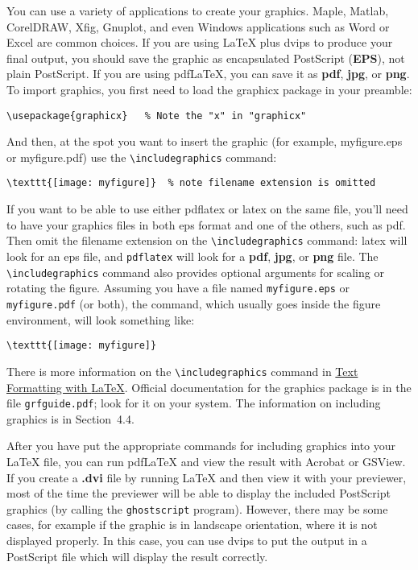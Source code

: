 \documentclass[letterpaper,11pt]{article}
\begin{document}
You can use a variety of applications to create your graphics. Maple, Matlab, CorelDRAW,
Xfig, Gnuplot, and even Windows applications such as Word or Excel are common choices. If
you are using {\LaTeX} plus dvips to produce your final output, you should save the graphic as
encapsulated PostScript (\textbf{EPS}), not plain PostScript. If you are using pdf{\LaTeX}, you can save
it as \textbf{pdf}, \textbf{jpg}, or \textbf{png}.
To import graphics, you first need to load the graphicx package in
your preamble:
\begin{verbatim}
\usepackage{graphicx}   % Note the "x" in "graphicx"
\end{verbatim}
And then, at the spot you want to insert the graphic (for example, myfigure.eps or myfigure.pdf)
use the \verb|\includegraphics| command:
\begin{verbatim}
\texttt{[image: myfigure]}  % note filename extension is omitted
\end{verbatim}

If you want to be able to use either pdflatex or latex on the same file, you'll need to have your
graphics files in both eps format and one of the others, such as pdf. Then omit the filename
extension on the \verb|\includegraphics| command: latex will look for an eps file, and \verb|pdflatex|
will look for a \textbf{pdf}, \textbf{jpg}, or \textbf{png} file. The \verb|\includegraphics| command also provides optional
arguments for scaling or rotating the figure. Assuming you have a file named \verb|myfigure.eps|
or \verb|myfigure.pdf| (or both), the command, which usually goes inside the figure environment,
will look something like:
\begin{verbatim}
\texttt{[image: myfigure]}
\end{verbatim}
There is more information on the \verb|\includegraphics| command in
\href{ttp://www.rpi.edu/dept/arc/docs/latex/latex-intro.pdf}{Text Formatting with {\LaTeX}}.
Official documentation for the graphics package is in the file \verb|grfguide.pdf|; look for it on your
system. The information on including graphics is in Section~4.4.

After you have put the appropriate commands for including graphics into your {\LaTeX} file, you
can run pdf{\LaTeX} and view the result with Acrobat or GSView. If you create a \textbf{.dvi} file by
running {\LaTeX} and then view it with your previewer, most of the time the previewer will be able
to display the included PostScript graphics (by calling the \verb|ghostscript| program). However,
there may be some cases, for example if the graphic is in landscape orientation, where it is
not displayed properly. In this case, you can use dvips to put the output in a PostScript file
which will display the result correctly.
\end{document}
